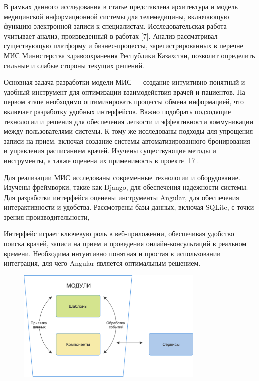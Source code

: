 В рамках данного исследования в статье представлена архитектура и модель
медицинской информационной системы для телемедицины, включающую функцию
электронной записи к специалистам. Исследовательская работа учитывает
анализ, произведенный в работах {[}7{]}. Анализ рассматривал
существующую платформу и бизнес-процессы, зарегистрированных в перечне
МИС Министерства здравоохранения Республики Казахстан, позволит
определить сильные и слабые стороны текущих решений.

Основная задача разработки модели МИС --- создание интуитивно понятный и
удобный инструмент для оптимизации взаимодействия врачей и пациентов. На
первом этапе необходимо оптимизировать процессы обмена информацией, что
включает разработку удобных интерфейсов. Важно подобрать подходящие
технологии и решения для обеспечения легкости и эффективности
коммуникации между пользователями системы. К тому же исследованы подходы
для упрощения записи на прием, включая создание системы
автоматизированного бронирования и управления расписанием врачей.
Изучены существующие методы и инструменты, а также оценена их
применимость в проекте {[}17{]}.

Для реализации МИС исследованы современные технологии и оборудование.
Изучены фреймворки, такие как Django, для обеспечения надежности
системы. Для разработки интерфейса оценены инструменты Angular, для
обеспечения интерактивности и удобства. Рассмотрены базы данных, включая
SQLite, с точки зрения производительности,

Интерфейс играет ключевую роль в веб-приложении, обеспечивая удобство
поиска врачей, записи на прием и проведения онлайн-консультаций в
реальном времени. Необходима интуитивно понятная и простая в
использовании интеграция, для чего Angular является оптимальным
решением.

\begin{figure}[H]
	\centering
	\includegraphics[width=0.8\textwidth]{assets/151}
	\caption*{}
\end{figure}

